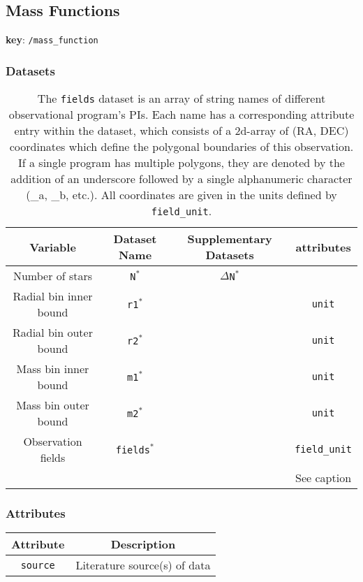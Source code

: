 \subsection{Mass Functions}

\textbf{key}: \texttt{/mass\_function}

\subsubsection{Datasets}

\begin{center}
\begin{table}[H]
\begin{tabular}{ | c | c | c | c | }
    \hline
    Variable & Dataset Name & Supplementary Datasets &  attributes \\
    \hline\hline
    Number of stars & \texttt{N\(^*\)} & \texttt{\(\Delta\)N\(^*\)} & \\
    \hline
    Radial bin inner bound & \texttt{r1\(^*\)} & & \texttt{unit} \\
    \hline
    Radial bin outer bound & \texttt{r2\(^*\)} & & \texttt{unit} \\
    \hline
    Mass bin inner bound & \texttt{m1\(^*\)} & & \texttt{unit} \\
    \hline
    Mass bin outer bound & \texttt{m2\(^*\)} & & \texttt{unit} \\
    \hline
    Observation fields & \texttt{fields\(^*\)} & &
    \texttt{field\_unit}\\ &&& See caption \\
    \hline
\end{tabular}
\caption*{
    The \texttt{fields} dataset is an array of string names of different
    observational program's PIs. Each name has a corresponding attribute entry
    within the dataset, which consists of a 2d-array of (RA, DEC) coordinates
    which define the polygonal boundaries of this observation. If a single
    program has multiple polygons, they are denoted by the addition of an
    underscore followed by a single alphanumeric character (\_a, \_b, etc.).
    All coordinates are given in the units defined by \texttt{field\_unit}.
}
\end{table}
\end{center}



\subsubsection{Attributes}

\begin{center}
\begin{table}[H]
\begin{tabular}{ | c | c | }
    \hline
    Attribute & Description \\
    \hline\hline
    \texttt{source} & Literature source(s) of data \\
    \hline
\end{tabular}
\end{table}
\end{center}
